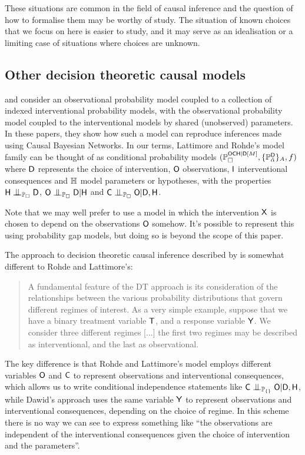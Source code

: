 These situations are common in the field of causal inference and the question of how to formalise them may be worthy of study. The situation of known choices that we focus on here is easier to study, and it may serve as an idealisation or a limiting case of situations where choices are unknown.

\subsection{Other decision theoretic causal models}

\citet{lattimore_causal_2019} and \citet{lattimore_replacing_2019} consider an observational probability model coupled to a collection of indexed interventional probability models, with the observational probability model coupled to the interventional models by shared (unobserved) parameters. In these papers, they show how such a model can reproduce inferences made using Causal Bayesian Networks. In our terms, Lattimore and Rohde's model family can be thought of as conditional probability models $(\mathbb{P}_\square^{\mathsf{OCH}|\mathsf{D}[M]},\{\mathbb{P}_{\tilde{\alpha}}^{\mathsf{D}}\}_A,f)$ where $\mathsf{D}$ represents the choice of intervention, $\mathsf{O}$ observations, $\mathsf{I}$ interventional consequences and $\mathbb{H}$ model parameters or hypotheses, with the properties $\RV{H}\CI_{\prob{P}_{\square}} \RV{D}$, $\RV{O}\CI_{\prob{P}_{\square}} \RV{D}|\RV{H}$ and $\RV{C}\CI_{\prob{P}_{\square}} \RV{O}|\RV{D},\RV{H}$.

Note that we may well prefer to use a model in which the intervention $\mathsf{X}$ is chosen to depend on the observations $\mathsf{O}$ somehow. It's possible to represent this using probability gap models, but doing so is beyond the scope of this paper.

The approach to decision theoretic causal inference described by \citet{dawid_decision-theoretic_2020} is somewhat different to Rohde and Lattimore's:

\begin{quote}
A fundamental feature of the DT approach is its consideration of the relationships between the various probability distributions that govern different regimes of interest. As a very simple example, suppose that we have a binary treatment variable $\mathsf{T}$, and a response variable $\mathsf{Y}$. We consider three different regimes [...] the first two regimes may be described as interventional, and the last as observational.
\end{quote}

The key difference is that Rohde and Lattimore's model employs different variables $\mathsf{O}$ and $\mathsf{C}$ to represent observations and interventional consequences, which allows us to write conditional independence statements like $\RV{C}\CI_{\prob{P}_{\{\}}} \RV{O}|\RV{D},\RV{H}$, while Dawid's approach uses the same variable $\mathsf{Y}$ to represent observations and interventional consequences, depending on the choice of regime. In this scheme there is no way we can see to express something like ``the observations are independent of the interventional consequences given the choice of intervention and the parameters''. 

